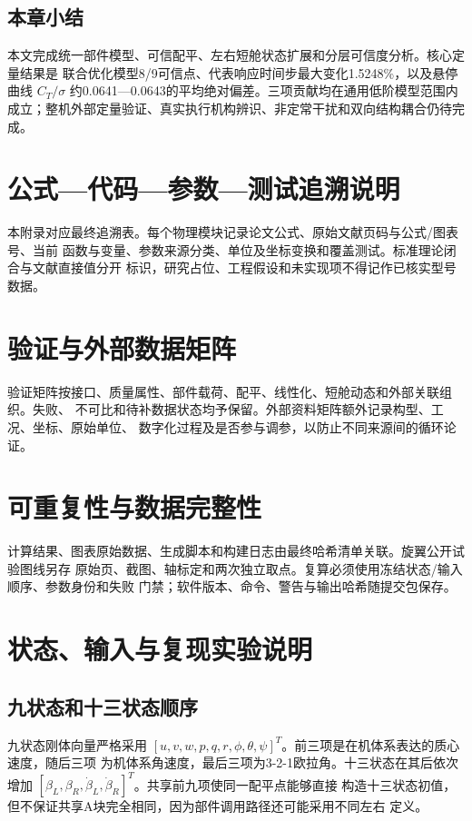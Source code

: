 \documentclass[UTF8,12pt,oneside,openany,fontset=windows]{ctexbook}
\begin{document}
\section{本章小结}

本文完成统一部件模型、可信配平、左右短舱状态扩展和分层可信度分析。核心定量结果是 联合优化模型8/9可信点、代表响应时间步最大变化1.5248\%，以及悬停曲线 \(C_T/\sigma\) 约0.0641—0.0643的平均绝对偏差。三项贡献均在通用低阶模型范围内 成立；整机外部定量验证、真实执行机构辨识、非定常干扰和双向结构耦合仍待完成。

\appendix
\chapter{公式—代码—参数—测试追溯说明}

本附录对应最终追溯表。每个物理模块记录论文公式、原始文献页码与公式/图表号、当前 函数与变量、参数来源分类、单位及坐标变换和覆盖测试。标准理论闭合与文献直接值分开 标识，研究占位、工程假设和未实现项不得记作已核实型号数据。

\chapter{验证与外部数据矩阵}

验证矩阵按接口、质量属性、部件载荷、配平、线性化、短舱动态和外部关联组织。失败、 不可比和待补数据状态均予保留。外部资料矩阵额外记录构型、工况、坐标、原始单位、 数字化过程及是否参与调参，以防止不同来源间的循环论证。

\chapter{可重复性与数据完整性}

计算结果、图表原始数据、生成脚本和构建日志由最终哈希清单关联。旋翼公开试验图线另存 原始页、截图、轴标定和两次独立取点。复算必须使用冻结状态/输入顺序、参数身份和失败 门禁；软件版本、命令、警告与输出哈希随提交包保存。

\chapter{状态、输入与复现实验说明}

\section{九状态和十三状态顺序}

九状态刚体向量严格采用 \([u,v,w,p,q,r,\phi,\theta,\psi]^T\)。前三项是在机体系表达的质心速度，随后三项 为机体系角速度，最后三项为3-2-1欧拉角。十三状态在其后依次增加 \([\beta_L,\beta_R,\dot\beta_L,\dot\beta_R]^T\)。共享前九项使同一配平点能够直接 构造十三状态初值，但不保证共享A块完全相同，因为部件调用路径还可能采用不同左右 定义。
\end{document}

